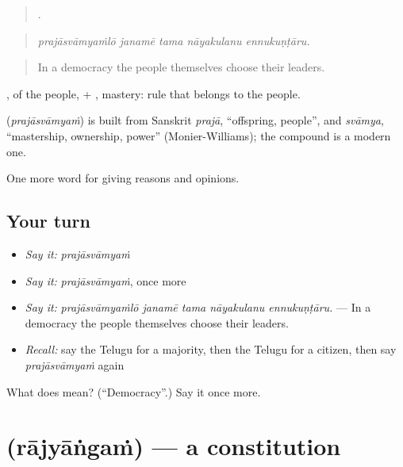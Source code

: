 \begin{quote}
    .
\end{quote}

\begin{quote}
\emph{prajāsvāmyaṁlō janamē tama nāyakulanu ennukuṇṭāru.}
\end{quote}

\begin{quote}
In a democracy the people themselves choose their leaders.
\end{quote}

, of the people, + , mastery: rule that belongs to the people.

\begin{cousinweb}
\textbf{} (\emph{prajāsvāmyaṁ}) is built from Sanskrit \emph{prajā}, \textquotedblleft{}offspring, people\textquotedblright{}, and \emph{svāmya}, \textquotedblleft{}mastership, ownership, power\textquotedblright{} (Monier-Williams); the compound is a modern one.
\end{cousinweb}

\begin{grammarlens}[title={What you've built}]
One more word for giving reasons and opinions.
\end{grammarlens}

\subsection*{Your turn}
\begin{itemize}
\raggedright
  \item \emph{Say it:} \emph{prajāsvāmyaṁ}
  \item \emph{Say it:} \emph{prajāsvāmyaṁ}, once more
  \item \emph{Say it:} \emph{prajāsvāmyaṁlō janamē tama nāyakulanu ennukuṇṭāru.} — In a democracy the people themselves choose their leaders.
  \item \emph{Recall:} say the Telugu for a majority, then the Telugu for a citizen, then say \emph{prajāsvāmyaṁ} again
\end{itemize}

\begin{tcolorbox}[breakable,colback=teal!4,colframe=teal!35!black,title={Before you move on}]
What does  mean? (\textquotedblleft{}Democracy\textquotedblright{}.) Say it once more.
\end{tcolorbox}
\section[\texorpdfstring{\te{రాజ్యాంగం} (rājyāṅgaṁ)}{రాజ్యాంగం (rājyāṅgaṁ)}]{ (rājyāṅgaṁ) — a constitution}

